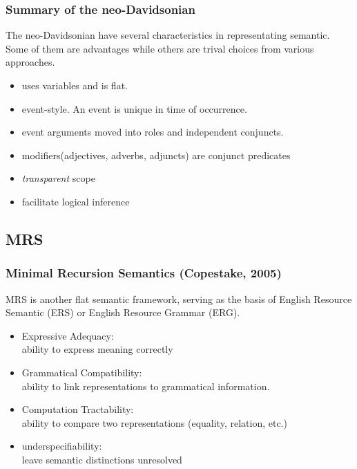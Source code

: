 \documentclass{beamer}
\begin{document}
\begin{frame}
    \frametitle{Summary of the neo-Davidsonian}

    The neo-Davidsonian have several characteristics in representating semantic.
    Some of them are advantages while others are trival choices from various approaches.

    \begin{itemize}
        \item uses variables and is flat.
        \item \alert{event}-style. An event is unique in time of occurrence.
        \item event arguments moved into roles and independent conjuncts.
        \item modifiers(adjectives, adverbs, adjuncts) are conjunct predicates
        \item \emph{transparent} scope
        \item facilitate logical inference
    \end{itemize}

\end{frame}

\subsection{MRS}

\begin{frame}
    \frametitle{Minimal Recursion Semantics (Copestake, 2005)}

    MRS is another \alert{flat} semantic framework,
    serving as the basis of English Resource Semantic (ERS) or English Resource Grammar (ERG).

    \begin{itemize}
        \item Expressive Adequacy: \\
            ability to express meaning correctly
        \item Grammatical Compatibility: \\
            ability to link representations to grammatical information.
        \item Computation Tractability: \\
            ability to compare two representations (equality, relation, etc.)
        \item \alert{underspecifiability}: \\
            leave semantic distinctions unresolved
    \end{itemize}
\end{frame}
\end{document}
